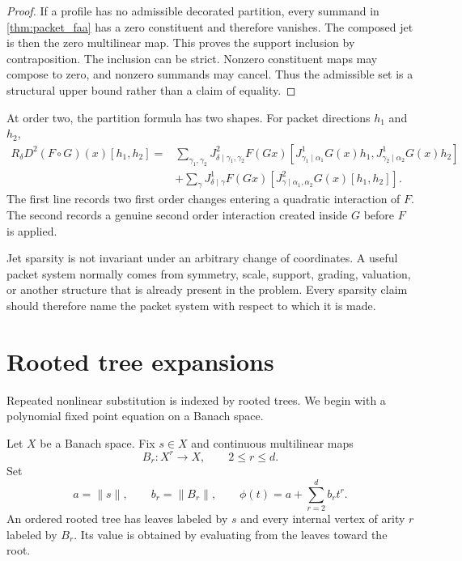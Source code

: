 \begin{proof}
If a profile has no admissible decorated partition, every summand in \cref{thm:packet_faa} has a zero constituent and therefore vanishes. The composed jet is then the zero multilinear map. This proves the support inclusion by contraposition. The inclusion can be strict. Nonzero constituent maps may compose to zero, and nonzero summands may cancel. Thus the admissible set is a structural upper bound rather than a claim of equality.
\end{proof}


\begin{example}\label{ex:second_order_composition}
At order two, the partition formula has two shapes.  For packet directions $h_1$ and $h_2$,
\[
\begin{aligned}
R_\delta D^2(F\circ G)(x)[h_1,h_2]
={}&
\sum_{\gamma_1,\gamma_2}
J^2_{\delta\mid\gamma_1,\gamma_2}F(Gx)
[J^1_{\gamma_1\mid\alpha_1}G(x)h_1,J^1_{\gamma_2\mid\alpha_2}G(x)h_2]\\
&+
\sum_\gamma
J^1_{\delta\mid\gamma}F(Gx)
[J^2_{\gamma\mid\alpha_1,\alpha_2}G(x)[h_1,h_2]].
\end{aligned}
\]
The first line records two first order changes entering a quadratic interaction of $F$.  The second records a genuine second order interaction created inside $G$ before $F$ is applied.
\end{example}

\begin{remark}\label{rem:jet_coordinate_dependence}
Jet sparsity is not invariant under an arbitrary change of coordinates.  A useful packet system normally comes from symmetry, scale, support, grading, valuation, or another structure that is already present in the problem.  Every sparsity claim should therefore name the packet system with respect to which it is made.
\end{remark}

\section{Rooted tree expansions}\label{sec:trees}

Repeated nonlinear substitution is indexed by rooted trees.  We begin with a polynomial fixed point equation on a Banach space.

Let $X$ be a Banach space.  Fix $s\in X$ and continuous multilinear maps
\[
B_r:X^r\longrightarrow X,
\qquad
2\le r\le d.
\]
Set
\[
a=\|s\|,
\qquad
b_r=\|B_r\|,
\qquad
\phi(t)=a+\sum_{r=2}^{d}b_rt^r.
\]
An ordered rooted tree has leaves labeled by $s$ and every internal vertex of arity $r$ labeled by $B_r$.  Its value is obtained by evaluating from the leaves toward the root.

